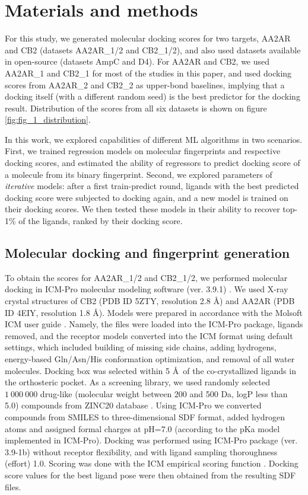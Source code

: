 \section{Materials and methods}
For this study, we generated molecular docking scores for two targets, AA2AR and CB2 (datasets AA2AR\_1/2 and CB2\_1/2), and also used datasets available in open-source \cite{ultralarge_docking_first} (datasets AmpC and D4). For AA2AR and CB2, we used AA2AR\_1 and CB2\_1 for most of the studies in this paper, and used docking scores from AA2AR\_2 and CB2\_2 as upper-bond baselines, implying that a docking itself (with a different random seed) is the best predictor for the docking result. Distribution of the scores from all six datasets is shown on figure \ref{fig:fig_1_distribution}.

In this work, we explored capabilities of different ML algorithms in two scenarios. First, we trained regression models on molecular fingerprints and respective docking scores, and estimated the ability of regressors to predict docking score of a molecule from its binary fingerprint. Second, we explored parameters of \textit{iterative} models: after a first train-predict round, ligands with the best predicted docking score were subjected to docking again, and a new model is trained on their docking scores. We then tested these models in their ability to recover top-1\% of the ligands, ranked by their docking score.


\subsection{Molecular docking and fingerprint generation}
To obtain the scores for AA2AR\_1/2 and CB2\_1/2, we performed molecular docking in ICM-Pro molecular modeling software (ver. 3.9.1) \cite{molsoft_guide}. We used X-ray crystal structures of CB2 (PDB ID 5ZTY, resolution 2.8 \AA) and AA2AR (PDB ID 4EIY, resolution 1.8 \AA). Models were prepared in accordance with the Molsoft ICM user guide \cite{molsoft_guide}. Namely, the files were loaded into the ICM-Pro package, ligands removed, and the receptor models converted into the ICM format using default settings, which included building of missing side chains, adding hydrogens, energy-based Gln/Asn/His conformation optimization, and removal of all water molecules. Docking box was selected within 5 \AA \ of the co-crystallized ligands in the orthosteric pocket. As a screening library, we used randomly selected $1\ 000\ 000$ drug-like (molecular weight between 200 and 500 Da, logP less than 5.0) compounds from ZINC20 database \cite{Irwin2020ZINC20Discovery}. Using ICM-Pro we converted compounds from SMILES to three-dimensional SDF  format, added hydrogen atoms and assigned formal charges at pH=7.0 (according to the pKa model implemented in ICM-Pro). Docking was performed using ICM-Pro package (ver. 3.9-1b) without receptor flexibility, and with ligand sampling thoroughness (effort) 1.0. Scoring was done with the ICM empirical scoring function \cite{abagyan_biased_1994}. Docking score values for the best ligand pose were then obtained from the resulting SDF files.


